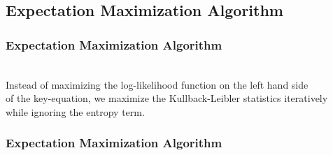 \subsection{Expectation Maximization Algorithm}

\begin{frame}
  \frametitle{Expectation Maximization Algorithm}

   \\[0.5cm]

  Instead of maximizing the log-likelihood function on the left hand side \\
  of the key-equation, we maximize the Kullback-Leibler statistics iteratively \\
  while ignoring the entropy term.
\end{frame}


\begin{frame}
  \frametitle{Expectation Maximization Algorithm \cont}

  \begin{centernss}
  \end{centernss}
%
\end{frame}


